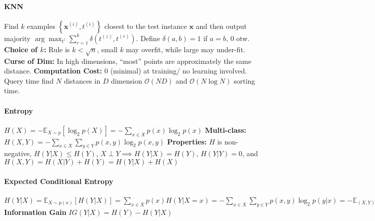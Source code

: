 \documentclass[10pt]{article}
\newcommand{\bx}{\mathbf{x}}
\begin{document}

\paragraph{KNN} Find $k$ examples $\left\{ \bx^{(i)}, t^{(i)} \right\}$ closest to the test instance $\bx$ and then output majority $\arg \max_{t^{z}} \sum_{r = 1}^k \delta (t^{(z)}, t^{(r)})$. Define $\delta (a, b) = 1$ if $a = b$, $0$ otw. \textbf{Choice of $k$:} Rule is $k < \sqrt{n}$, small $k$ may overfit, while large may under-fit. \textbf{Curse of Dim:} In high dimensions, ``most'' points are approximately the same distance. \textbf{Computation Cost:} 0 (minimal) at training/ no learning involved. Query time find $N$ distances in $D$ dimension $\mathcal{O}(ND)$ and $\mathcal{O}(N \log N)$ sorting time.
\paragraph{Entropy} $H(X)=-\mathbb{E}_{X \sim p}\left[\log _{2} p(X)\right]=-\sum_{x \in X} p(x) \log _{2} p(x)$ \textbf{ Multi-class: } $H(X, Y)=-\sum_{x \in X} \sum_{y \in Y} p(x, y) \log _{2} p(x, y)$ \textbf{ Properties: } $H$ is non-negative, $H(Y|X) \leq H(Y)$, $X\perp Y \implies H(Y|X) = H(Y)$, $H(Y|Y) = 0$, and $H(X,Y) = H(X|Y) + H(Y) = H(Y|X) + H(X)$
\paragraph{Expected Conditional Entropy} $ H(Y | X) =\mathbb{E}_{X \sim p(x)}[H(Y | X)] =\sum_{x \in X} p(x) H(Y | X=x) =-\sum_{x \in X} \sum_{y \in Y} p(x, y) \log _{2} p(y | x) =-\mathbb{E}_{(X, Y) \sim p(x, y)}\left[\log _{2} p(Y | X)\right]$ \textbf{Information Gain} $IG(Y | X)=H(Y)-H(Y | X)$ 
\end{document}
